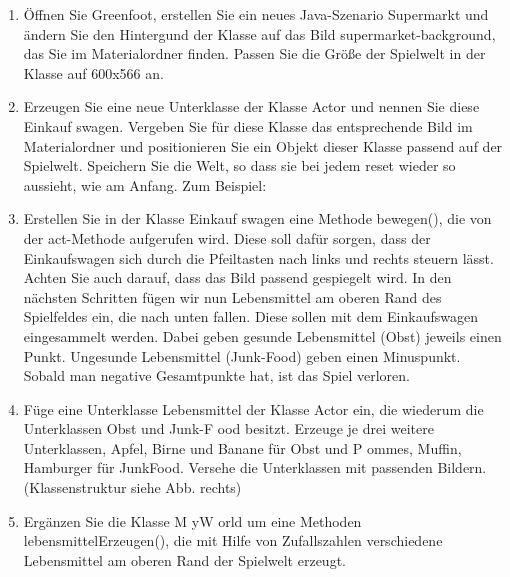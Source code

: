 \documentclass{lehramt-informatik-haupt}
\begin{document}
\begin{enumerate}


\item Öffnen Sie Greenfoot, erstellen Sie ein neues Java-Szenario
Supermarkt und ändern Sie den Hintergund der Klasse  auf
das Bild supermarket-background, das Sie im Materialordner finden.
Passen Sie die Größe der Spielwelt in der Klasse  auf
600x566 an.


\item Erzeugen Sie eine neue Unterklasse der Klasse Actor und nennen Sie
diese Einkauf swagen. Vergeben Sie für diese Klasse das entsprechende
Bild im Materialordner und positionieren Sie ein Objekt dieser Klasse
passend auf der Spielwelt. Speichern Sie die Welt, so dass sie bei jedem
reset wieder so aussieht, wie am Anfang. Zum Beispiel:


\item Erstellen Sie in der Klasse Einkauf swagen eine Methode bewegen(),
die von der act-Methode aufgerufen wird. Diese soll dafür sorgen, dass
der Einkaufswagen sich durch die Pfeiltasten nach links und rechts
steuern lässt. Achten Sie auch darauf, dass das Bild passend gespiegelt
wird. In den nächsten Schritten fügen wir nun Lebensmittel am oberen
Rand des Spielfeldes ein, die nach unten fallen. Diese sollen mit dem
Einkaufswagen eingesammelt werden. Dabei geben gesunde Lebensmittel
(Obst) jeweils einen Punkt. Ungesunde Lebensmittel (Junk-Food) geben
einen Minuspunkt. Sobald man negative Gesamtpunkte hat, ist das Spiel
verloren.


\item Füge eine Unterklasse Lebensmittel der Klasse Actor ein, die
wiederum die Unterklassen Obst und Junk-F ood besitzt. Erzeuge je drei
weitere Unterklassen, \zB Apfel, Birne und Banane für Obst und P
ommes, Muffin, Hamburger für JunkFood. Versehe die Unterklassen mit
passenden Bildern. (Klassenstruktur siehe Abb. rechts)


\item Ergänzen Sie die Klasse M yW orld um eine Methoden
lebensmittelErzeugen(), die mit Hilfe von Zufallszahlen verschiedene
Lebensmittel am oberen Rand der Spielwelt erzeugt.



\end{enumerate}
\end{document}
